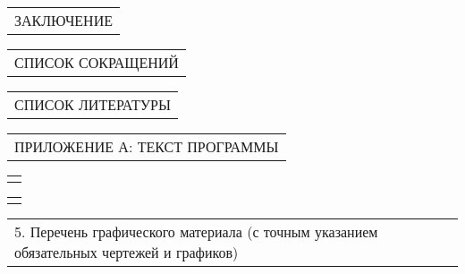 \documentclass[12pt, А4, twoside]{article}
\begin{document}
\begin{FlushLeft}
    \vspace{-0.1 cm}

    \begin{tabular}{p{17.25cm}}
        \hspace{0.3cm} \textsf{ЗАКЛЮЧЕНИЕ} \vspace{1pt} \hline \\
    \end{tabular}

    \vspace{-0.1 cm}

    \begin{tabular}{p{17.25cm}}
        \hspace{0.3cm} \textsf{СПИСОК СОКРАЩЕНИЙ} \vspace{0pt} \hline \\
    \end{tabular}

    \vspace{-0.1 cm}

    \begin{tabular}{p{17.25cm}}
        \hspace{0.3cm} \textsf{СПИСОК ЛИТЕРАТУРЫ} \vspace{1pt} \hline  \\
    \end{tabular}

    \vspace{-0.1 cm}

    \begin{tabular}{p{17.25cm}}
        \hspace{0.3cm} \textsf{ПРИЛОЖЕНИЕ А: ТЕКСТ ПРОГРАММЫ} \vspace{1pt} \hline  \\
    \end{tabular}

    \begin{tabular}{p{17.25cm}}
        \vspace{0pt} \hline \\
    \end{tabular}

    \begin{tabular}{p{17.25cm}}
        \vspace{0pt} \hline \\
    \end{tabular}

    \vspace{0.1 cm}

    \begin{tabular}{p{17.25cm}}
        \textsf{5. Перечень графического материала (с точным указанием обязательных чертежей и графиков)} \vspace{0pt} \hline \\
    \end{tabular}


\end{FlushLeft}
\end{document}
